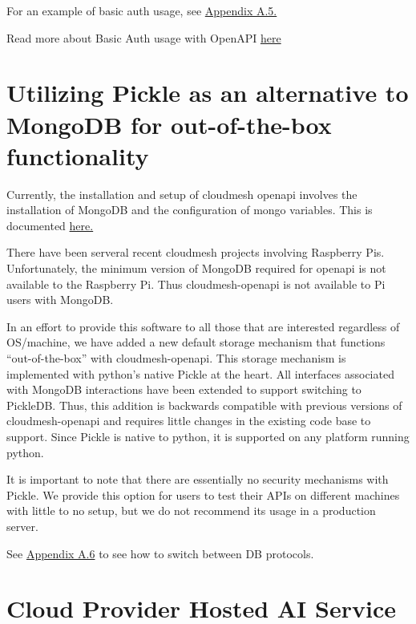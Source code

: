 For an example of basic auth usage, see
\protect\hyperlink{a5-basic-auth-example}{Appendix A.5.}

Read more about Basic Auth usage with OpenAPI
\href{https://swagger.io/docs/specification/authentication/basic-authentication/}{here}

\section{Utilizing Pickle as an alternative to MongoDB for
  out-of-the-box
  functionality}\label{utilizing-pickle-as-an-alternative-to-mongodb-for-out-of-the-box-functionality}

Currently, the installation and setup of cloudmesh openapi involves the
installation of MongoDB and the configuration of mongo variables. This
is documented
\href{https://github.com/cloudmesh/cloudmesh-openapi\#installation}{here.}

There have been serveral recent cloudmesh projects involving Raspberry
Pis. Unfortunately, the minimum version of MongoDB required for openapi
is not available to the Raspberry Pi. Thus cloudmesh-openapi is not
available to Pi users with MongoDB.

In an effort to provide this software to all those that are interested
regardless of OS/machine, we have added a new default storage mechanism
that functions ``out-of-the-box'' with cloudmesh-openapi. This storage
mechanism is implemented with python's native Pickle at the heart. All
interfaces associated with MongoDB interactions have been extended to
support switching to PickleDB. Thus, this addition is backwards
compatible with previous versions of cloudmesh-openapi and requires
little changes in the existing code base to support. Since Pickle is
native to python, it is supported on any platform running python.

It is important to note that there are essentially no security
mechanisms with Pickle. We provide this option for users to test their
APIs on different machines with little to no setup, but we do not
recommend its usage in a production server.

See
\protect\hyperlink{a6-switching-between-pickledb-and-mongodb}{Appendix
A.6} to see how to switch between DB protocols.

\section{Cloud Provider Hosted AI
Service}\label{cloud-provider-hosted-ai-service}


